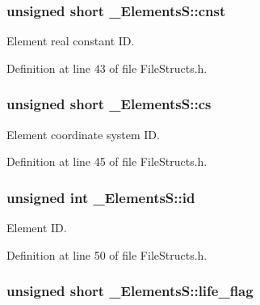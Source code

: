 \subsubsection[{\texorpdfstring{cnst}{cnst}}]{\setlength{\rightskip}{0pt plus 5cm}unsigned short \+\_\+\+Elements\+S\+::cnst}\hypertarget{struct___elements_s_ad11820e13b8992fd7465e5a3c4201e84}{}\label{struct___elements_s_ad11820e13b8992fd7465e5a3c4201e84}


Element real constant ID. 



Definition at line 43 of file File\+Structs.\+h.

\subsubsection[{\texorpdfstring{cs}{cs}}]{\setlength{\rightskip}{0pt plus 5cm}unsigned short \+\_\+\+Elements\+S\+::cs}\hypertarget{struct___elements_s_a59e50bef826fc636e452a480e42bb082}{}\label{struct___elements_s_a59e50bef826fc636e452a480e42bb082}


Element coordinate system ID. 



Definition at line 45 of file File\+Structs.\+h.

\subsubsection[{\texorpdfstring{id}{id}}]{\setlength{\rightskip}{0pt plus 5cm}unsigned int \+\_\+\+Elements\+S\+::id}\hypertarget{struct___elements_s_a782d0149d17748d22630799112b10680}{}\label{struct___elements_s_a782d0149d17748d22630799112b10680}


Element ID. 



Definition at line 50 of file File\+Structs.\+h.

\subsubsection[{\texorpdfstring{life\+\_\+flag}{life_flag}}]{\setlength{\rightskip}{0pt plus 5cm}unsigned short \+\_\+\+Elements\+S\+::life\+\_\+flag}\hypertarget{struct___elements_s_a966797bc046fea5472386a7a67867376}{}\label{struct___elements_s_a966797bc046fea5472386a7a67867376}


